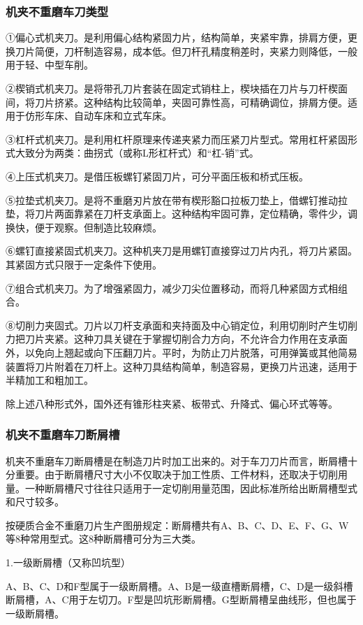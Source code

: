 \documentclass{ctexbook}
\begin{document}
\subsubsection{机夹不重磨车刀类型}
①偏心式机夹刀。是利用偏心结构紧固力片，结构简单，夹紧牢靠，排肩方便，更换刀片简便，刀杆制造容易，成本低。但刀杆孔精度稍差时，夹紧力则降低，一般用于轻、中型车削。

②楔销式机夹刀。是将带孔刀片套装在固定式销柱上，楔块插在刀片与刀杆楔面间，将刀片挤紧。这种结构比较简单，夹固可靠性高，可精确调位，排屑方便。适用于仿形车床、自动车床和立式车床。

③杠杆式机夹刀。是利用杠杆原理来传递夹紧力而压紧刀片型式。常用杠杆紧固形式大致分为两类：曲拐式（或称L形杠杆式）和“杠-销”式。

④上压式机夹刀。是借压板螺钉紧固刀片，可分平面压板和桥式压板。

⑤拉垫式机夹刀。是将不重磨刃片放在带有楔形豁口拉板刀垫上，借螺钉推动拉垫，将刀片两面靠紧在刀杆支承面上。这种结构牢固可靠，定位精确，零件少，调换快，便于观察。但制造比较麻烦。

⑥螺钉直接紧固式机夹刀。这种机夹刀是用螺钉直接穿过刀片内孔，将刀片紧固。其紧固方式只限于一定条件下使用。

⑦组合式机夹刀。为了增强紧固力，减少刀尖位置移动，而将几种紧固方式相组合。

⑧切削力夹固式。刀片以刀杆支承面和夹持面及中心销定位，利用切削时产生切削力把刀片夹紧。这种刀具关键在于掌握切削合力方向，不允许合力作用在支承面外，以免向上翘起或向下压翻刀片。平时，为防止刀片脱落，可用弹簧或其他简易装置将刀片附着在刀杆上。这种刀具结构简单，制造容易，更换刀片迅速，适用于半精加工和粗加工。

除上述八种形式外，国外还有锥形柱夹紧、板带式、升降式、偏心环式等等。
\subsubsection{机夹不重磨车刀断屑槽}
机夹不重磨车刀断屑槽是在制造刀片时加工出来的。对于车刀刀片而言，断屑槽十分重要。由于断屑槽尺寸大小不仅取决于加工性质、工件材料，还取决于切削用量。一种断屑槽尺寸往往只适用于一定切削用量范围，因此标准所给出断屑槽型式和尺寸较多。

按硬质合金不重磨刀片生产图册规定：断屑槽共有A、B、C、D、E、F、G、W等8种常用型式。这8种断屑槽可分为三大类。

1.一级断屑槽（又称凹坑型）

A、B、C、D和F型属于一级断屑槽。A、B是一级直槽断屑槽，C、D是一级斜槽断屑槽，A、C用于左切刀。F型是凹坑形断屑槽。G型断屑槽呈曲线形，但也属于一级断屑槽。
\end{document}
